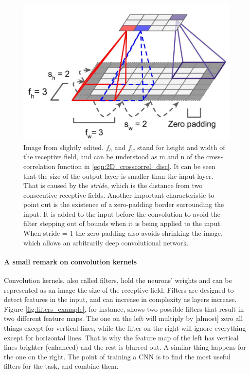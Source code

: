 \documentclass[../main.tex]{subfiles}
\begin{document}
\begin{figure}[H]
    \centering
    \includegraphics[width=0.7\linewidth]{images/2D_conv_example.JPG}
    \caption{Image from \cite{hands_on_ML_Aurelien} slightly edited. $f_h$ and $f_w$ stand for height and width of the receptive field, and can be understood as m and n of the cross-correlation function in \ref{eqn:2D_crosscorrel_disc}. It can be seen that the size of the output layer is smaller than the input layer. That is caused by the \textit{stride}, which is the distance from two consecutive receptive fields. Another important characteristic to point out is the existence of a zero-padding border surrounding the input. It is added to the input before the convolution to avoid the filter stepping out of bounds when it is being applied to the input. When stride = 1 the zero-padding also avoids shrinking the image, which allows an arbitrarily deep convolutional network.}
    \label{fig:2D_conv_example}
\end{figure}

\paragraph{A small remark on convolution kernels}
Convolution kernels, also called filters, hold the neurons' weights and can be represented as an image the size of the receptive field. Filters are designed to detect features in the input, and can increase in complexity as layers increase. Figure \ref{fig:filters_example}, for instance, shows two possible filters that result in two different feature maps. The one on the left will multiply by [almost] zero all things except for vertical lines, while the filter on the right will ignore everything except for horizontal lines. That is why the feature map of the left has vertical lines brighter (enhanced) and the rest is blurred out. A similar thing happens for the one on the right. The point of training a CNN is to find the most useful filters for the task, and combine them.
\end{document}
